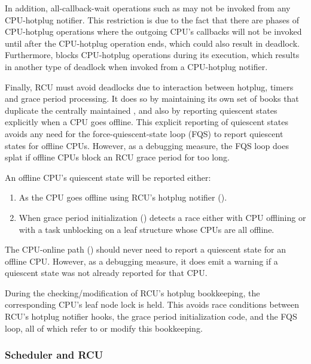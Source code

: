 In addition, all-callback-wait operations such as  may
not be invoked from any CPU-hotplug notifier.
This restriction is due
to the fact that there are phases of CPU-hotplug operations where the
outgoing CPU's callbacks will not be invoked until after the CPU-hotplug
operation ends, which could also result in deadlock.
Furthermore,
 blocks CPU-hotplug operations during its execution,
which results in another type of deadlock when invoked from a CPU-hotplug
notifier.

Finally, RCU must avoid deadlocks due to interaction between hotplug,
timers and grace period processing.
It does so by maintaining its own set
of books that duplicate the centrally maintained ,
and also by reporting quiescent states explicitly when a CPU goes
offline.
This explicit reporting of quiescent states avoids any need
for the force-quiescent-state loop (FQS) to report quiescent states for
offline CPUs.
However, as a debugging measure, the FQS loop does splat
if offline CPUs block an RCU grace period for too long.

An offline CPU's quiescent state will be reported either:

\begin{enumerate}
\item  As the CPU goes offline using RCU's hotplug notifier ().
\item  When grace period initialization () detects a
    race either with CPU offlining or with a task unblocking on a leaf
     structure whose CPUs are all offline.
\end{enumerate}

The CPU-online path () should never need to report
a quiescent state for an offline CPU\@.
However, as a debugging measure,
it does emit a warning if a quiescent state was not already reported
for that CPU\@.

During the checking/modification of RCU's hotplug bookkeeping, the
corresponding CPU's leaf node lock is held.
This avoids race conditions
between RCU's hotplug notifier hooks, the grace period initialization
code, and the FQS loop, all of which refer to or modify this bookkeeping.


\subsubsection{Scheduler and RCU}


